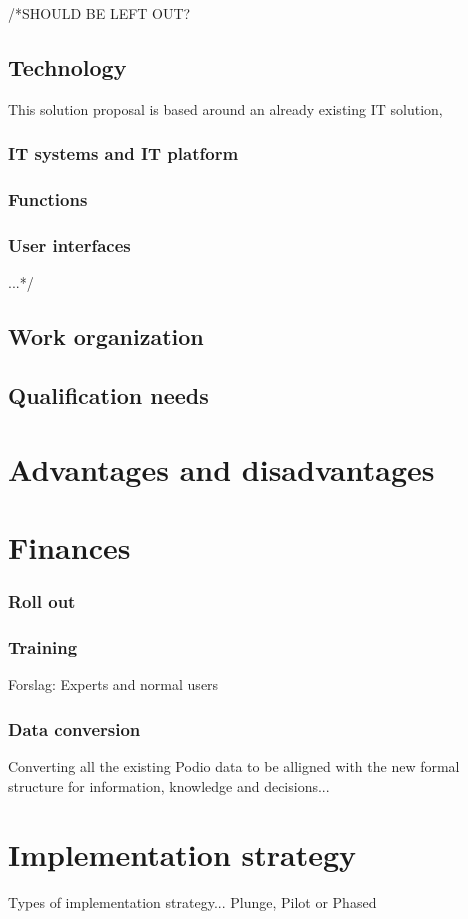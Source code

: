 /*SHOULD BE LEFT OUT?
\subsection{Technology}
This solution proposal is based around an already existing IT solution, 
\subsubsection{IT systems and IT platform}

\subsubsection{Functions}

\subsubsection{User interfaces}
...*/
\subsection{Work organization}

\subsection{Qualification needs}

\section{Advantages and disadvantages}

\section{Finances}
\subsubsection{Roll out}
\subsubsection{Training}
Forslag: Experts and normal users
\subsubsection{Data conversion}
Converting all the existing Podio data to be alligned with the new formal structure for information, knowledge and decisions...

\section{Implementation strategy}
Types of implementation strategy... Plunge, Pilot or Phased



